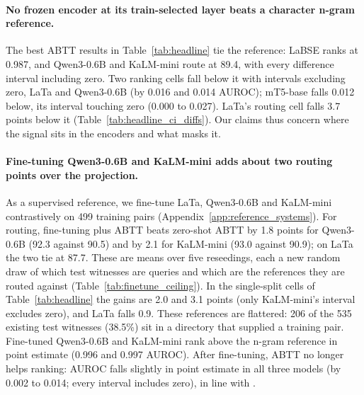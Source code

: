 \documentclass[11pt]{article}
\begin{document}
\paragraph{No frozen encoder at its train-selected layer beats a character n-gram reference.}
The best ABTT results in Table~\ref{tab:headline} tie the reference: LaBSE ranks at 0.987, and Qwen3-0.6B and KaLM-mini route at 89.4, with every difference interval including zero.
Two ranking cells fall below it with intervals excluding zero, LaTa and Qwen3-0.6B (by 0.016 and 0.014 AUROC); mT5-base falls 0.012 below, its interval touching zero (0.000 to 0.027).
LaTa's routing cell falls 3.7 points below it (Table~\ref{tab:headline_ci_diffs}).
Our claims thus concern where the signal sits in the encoders and what masks it.

\paragraph{Fine-tuning Qwen3-0.6B and KaLM-mini adds about two routing points over the projection.}
As a supervised reference, we fine-tune LaTa, Qwen3-0.6B and KaLM-mini contrastively on 499 training pairs (Appendix~\ref{app:reference_systems}).
For routing, fine-tuning plus ABTT beats zero-shot ABTT by 1.8 points for Qwen3-0.6B (92.3 against 90.5) and by 2.1 for KaLM-mini (93.0 against 90.9); on LaTa the two tie at 87.7.
These are means over five reseedings, each a new random draw of which test witnesses are queries and which are the references they are routed against (Table~\ref{tab:finetune_ceiling}).
In the single-split cells of Table~\ref{tab:headline} the gains are 2.0 and 3.1 points (only KaLM-mini's interval excludes zero), and LaTa falls 0.9.
These references are flattered: 206 of the 535 existing test witnesses (38.5\%) sit in a directory that supplied a training pair.
Fine-tuned Qwen3-0.6B and KaLM-mini rank above the n-gram reference in point estimate (0.996 and 0.997 AUROC).
After fine-tuning, ABTT no longer helps ranking: AUROC falls slightly in point estimate in all three models (by 0.002 to 0.014; every interval includes zero), in line with \citet{rajaee2021finetuning}.


\end{document}
